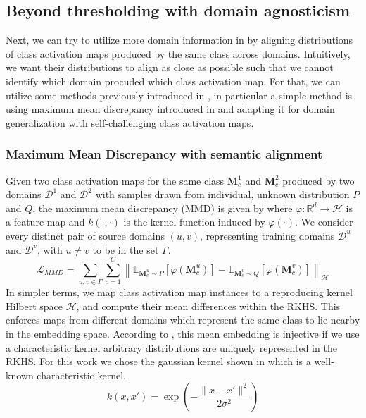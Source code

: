 \subsection{Beyond thresholding with domain agnosticism}
Next, we can try to utilize more domain information in \scam by aligning distributions of class activation maps produced by the same class across domains. Intuitively, we want their distributions to align as close as possible such that we cannot identify which domain procuded which class activation map. For that, we can utilize some methods previously introduced in , in particular a simple method is using maximum mean discrepancy introduced in  and adapting it for domain generalization with self-challenging class activation maps.

\subsubsection{Maximum Mean Discrepancy with semantic alignment}
Given two class activation maps for the same class $\mathbf{M}^1_c$ and $\mathbf{M}^2_c$ produced by two domains $\mathcal{D}^1$ and $\mathcal{D}^2$ with samples drawn from individual, unknown distribution $P$ and $Q$, the maximum mean discrepancy (MMD) is given by  where $\varphi: \mathbb{R}^{d} \rightarrow \mathcal{H}$ is a feature map and $k(\cdot, \cdot)$ is the kernel function induced by $\varphi(\cdot)$. We consider every distinct pair of source domains $(u,v)$, representing training domains $\mathcal{D}^u$ and $\mathcal{D}^v$, with $u\neq v$ to be in the set $\Gamma$.
\begin{equation}
\label{eq:mmd_maps}
    \mathcal{L}_{MMD} =\sum_{u,v \in \Gamma}\sum_{c=1}^C\left\|\mathbb{E}_{\mathbf{M}^u_c \sim P}[\varphi(\mathbf{M}^u_c)]-\mathbb{E}_{\mathbf{M}^v_c \sim Q}[\varphi(\mathbf{M}^v_c)]\right\|_{\mathcal{H}}
\end{equation}
In simpler terms, we map class activation map instances to a reproducing kernel Hilbert space $\mathcal{H}$, and compute their mean differences within the RKHS. This enforces maps from different domains which represent the same class to lie nearby in the embedding space. According to \citet{SriperumbudurFGLS09}, this mean embedding is injective if we use a characteristic kernel \ie arbitrary distributions are uniquely represented in the RKHS. For this work we chose the gaussian kernel shown in  which is a well-known characteristic kernel.
\begin{equation}
\label{eq:gaussian_kernel}
    k(x,x') = \exp \left(-\frac{\|x-x'\|^{2}}{2 \sigma^{2}}\right)
\end{equation}

